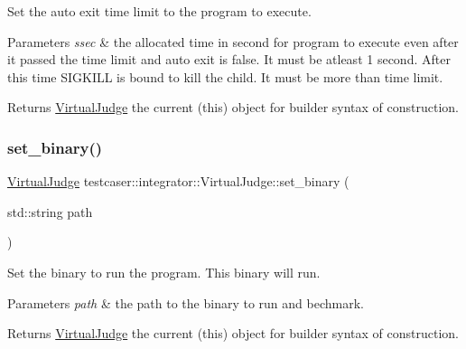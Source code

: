 Set the auto exit time limit to the program to execute. 


\begin{DoxyParams}{Parameters}
{\em ssec} & the allocated time in second for program to execute even after it passed the time limit and auto exit is false. It must be atleast 1 second. After this time S\+I\+G\+K\+I\+LL is bound to kill the child. It must be more than time limit. \\
\hline
\end{DoxyParams}
\begin{DoxyReturn}{Returns}
\mbox{\hyperlink{classtestcaser_1_1integrator_1_1VirtualJudge}{Virtual\+Judge}} the current (this) object for builder syntax of construction. 
\end{DoxyReturn}
\mbox{\label{classtestcaser_1_1integrator_1_1VirtualJudge_ae9fc3d7bf1bf75fc1ec695fe831d16b6}} 
\subsubsection{\texorpdfstring{set\_binary()}{set\_binary()}}
{\footnotesize\ttfamily \mbox{\hyperlink{classtestcaser_1_1integrator_1_1VirtualJudge}{Virtual\+Judge}} testcaser\+::integrator\+::\+Virtual\+Judge\+::set\+\_\+binary (\begin{DoxyParamCaption}\item[{std\+::string}]{path }\end{DoxyParamCaption})\hspace{0.3cm}{\ttfamily [inline]}}



Set the binary to run the program. This binary will run. 


\begin{DoxyParams}{Parameters}
{\em path} & the path to the binary to run and bechmark. \\
\hline
\end{DoxyParams}
\begin{DoxyReturn}{Returns}
\mbox{\hyperlink{classtestcaser_1_1integrator_1_1VirtualJudge}{Virtual\+Judge}} the current (this) object for builder syntax of construction. 
\end{DoxyReturn}
\mbox{\label{classtestcaser_1_1integrator_1_1VirtualJudge_ad982d30de1a2f9033cb042313d748292}} 
